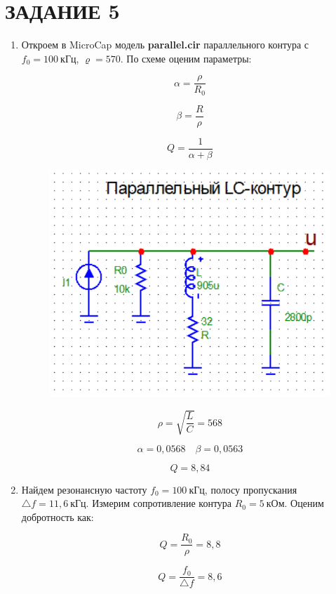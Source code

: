 \documentclass[a4paper, 12pt]{article}%
\begin{document}
\section*{ЗАДАНИЕ 5}

\begin{enumerate}

\item Откроем в MicroCap модель \textbf{parallel.cir} параллельного контура с $f_0 = 100 \: \textit{кГц}$, $\varrho = 570$. По схеме оценим параметры:

\[\alpha = \frac{\rho}{R_0}\]

\[\beta = \frac{R}{\rho}\]

\[Q = \frac{1}{\alpha + \beta}\]

\begin{figure}[h!]
\centering
\includegraphics[scale=0.4]{parallel_img.png}
\label{fig:Image1}
\end{figure} 

\[\rho = \sqrt{\frac{L}{C}} = 568\]

\[\alpha = 0,0568 \quad \beta = 0,0563\]

\[Q = 8,84\]

\item Найдем резонансную частоту $f_0 = 100 \: \textit{кГц}$, полосу пропускания $\triangle f = 11,6 \: \textit{кГц}$. Измерим сопротивление контура $R_0 = 5 \: \textit{кОм}$. Оценим добротность как:

\[Q = \frac{R_0}{\rho} = 8,8\]

\[Q = \frac{f_0}{\triangle f} = 8,6\]


\end{enumerate}
\end{document}
